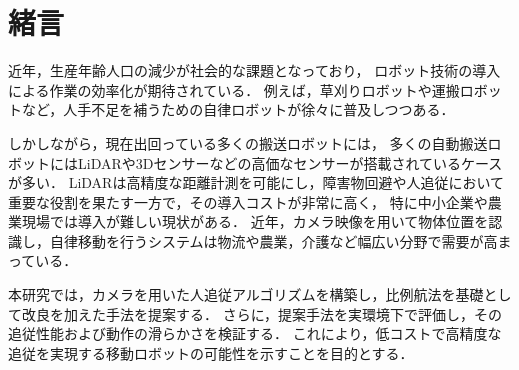 \section{緒言}

近年，生産年齢人口の減少が社会的な課題となっており，
ロボット技術の導入による作業の効率化が期待されている．
例えば，草刈りロボットや運搬ロボットなど，人手不足を補うための自律ロボットが徐々に普及しつつある\cite{saga-u}．

しかしながら，現在出回っている多くの搬送ロボットには，
多くの自動搬送ロボットにはLiDARや3Dセンサーなどの高価なセンサーが搭載されているケースが多い．
LiDARは高精度な距離計測を可能にし，障害物回避や人追従において重要な役割を果たす一方で，その導入コストが非常に高く，
特に中小企業や農業現場では導入が難しい現状がある．
近年，カメラ映像を用いて物体位置を認識し，自律移動を行うシステムは物流や農業，介護など幅広い分野で需要が高まっている\cite{saga-u}\cite{roshon}．

本研究では，カメラを用いた人追従アルゴリズムを構築し，比例航法\cite{hirei}を基礎として改良を加えた手法を提案する．
さらに，提案手法を実環境下で評価し，その追従性能および動作の滑らかさを検証する．
これにより，低コストで高精度な追従を実現する移動ロボットの可能性を示すことを目的とする．